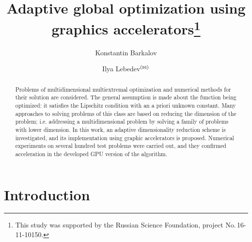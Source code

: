 \documentclass{svproc}
\def\orcidID#1{\unskip$^{[#1]}$}
\def\letter{$^{\textrm{(\Letter)}}$}
\begin{document}
\mainmatter              %
%
\title{Adaptive global optimization using graphics accelerators\thanks{This study was supported by the Russian Science Foundation, project No.\,16-11-10150.}
}
%
%
\author{Konstantin Barkalov%
\and Ilya Lebedev\letter%
}

%
%
%
	
\maketitle              %

\begin{abstract}

Problems of multidimensional multiextremal optimization and numerical methods for their solution are considered. The general assumption is made about the function being optimized: it satisfies the Lipschitz condition with an a priori unknown constant. Many approaches to solving problems of this class are based on reducing the dimension of the problem; i.e. addressing a multidimensional problem by solving a family of problems with lower dimension. In this work, an adaptive dimensionality reduction scheme is investigated, and its implementation using graphic accelerators is proposed. Numerical experiments on several hundred test problems were carried out, and they confirmed acceleration in the developed GPU version of the algorithm.


\end{abstract}

\section{Introduction}
\end{document}
